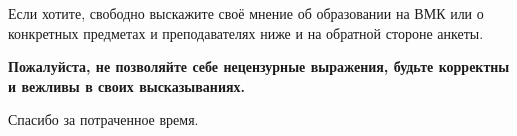 Если хотите, свободно выскажите своё мнение об образовании на ВМК или о конкретных предметах и
преподавателях ниже и на обратной стороне анкеты.

\textbf{Пожалуйста, не позволяйте себе нецензурные выражения, будьте корректны и вежливы в своих \newline высказываниях.}

Спасибо за потраченное время.


